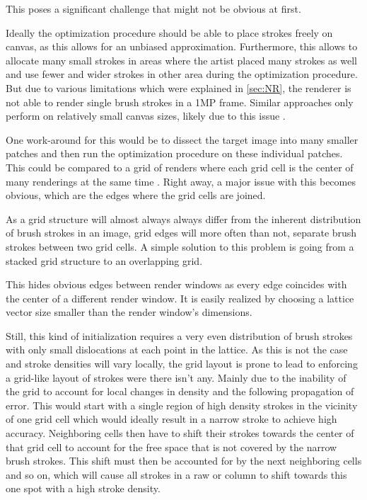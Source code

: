This poses a significant challenge that might not be obvious at first.

Ideally the optimization procedure should be able to place strokes freely on canvas,
as this allows for an unbiased approximation.
Furthermore, this allows to allocate many small strokes in areas where the artist
placed many strokes as well and use fewer and wider strokes in other area during
the optimization procedure.
But due to various limitations which were explained in \ref{sec:NR}, the renderer
is not able to render single brush strokes in a 1MP frame.
Similar approaches only perform on relatively small canvas sizes, likely due to this
issue .

One work-around for this would be to dissect the target image into many smaller
patches and then run the optimization procedure on these individual patches.
This could be compared to a grid of renders where each grid cell is the center of
many renderings at the same time .
Right away, a major issue with this becomes obvious, which are the edges where the
grid cells are joined.

As a grid structure will almost always always differ from the inherent distribution
of brush strokes in an image, grid edges will more often than not, separate brush
strokes between two grid cells.
A simple solution to this problem is going from a stacked grid structure to an overlapping
grid. 

This hides obvious edges between render windows as every edge coincides with the center
of a different render window.
It is easily realized by choosing a lattice vector size smaller than the render window's
dimensions.

Still, this kind of initialization requires a very even distribution of brush strokes
with only small dislocations at each point in the lattice.
As this is not the case and stroke densities will vary locally, the grid layout is prone
to lead to enforcing a grid-like layout of strokes were there isn't any.
Mainly due to the inability of the grid to account for local changes in density and
the following propagation of error.
This would start with a single region of high density strokes in the vicinity of one
grid cell which would ideally result in a narrow stroke to achieve high accuracy.
Neighboring cells then have to shift their strokes towards the center of that grid cell
to account for the free space that is not covered by the narrow brush strokes.
This shift must then be accounted for by the next neighboring cells and so on, which
will cause all strokes in a raw or column to shift towards this one spot with a high
stroke density.

